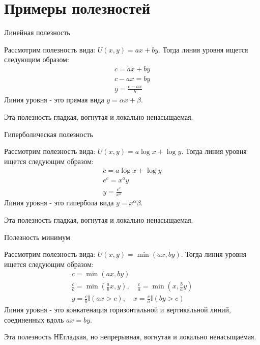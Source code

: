 \documentclass{beamer}
\begin{document}
\section{Примеры полезностей}

\begin{frame}{Линейная полезность}

Рассмотрим полезность вида: $U(x, y) = ax + by$. Тогда линия уровня ищется следующим образом: 
\begin{gather*}
c = ax + by\\
c-ax = by\\
y = \frac{c-ax}{b}
\end{gather*}
Линия уровня - это прямая вида $y = \alpha x + \beta$.

Эта полезность гладкая, вогнутая и локально ненасыщаемая.

\end{frame}

\begin{frame}{Гиперболическая полезность}

Рассмотрим полезность вида: $U(x, y) = a \log x + \log y$. Тогда линия уровня ищется следующим образом: 
\begin{gather*}
c =  a \log x + \log y\\
e^{c} = x^a y\\
y =\frac{e^{c}}{x^a}
\end{gather*}
Линия уровня - это гипербола вида $y = x^\alpha \beta$.

Эта полезность гладкая, вогнутая и локально ненасыщаемая.

\end{frame}

\begin{frame}{Полезность минимум}

Рассмотрим полезность вида: $U(x, y) = \min(ax, by)$. Тогда линия уровня ищется следующим образом: 
\begin{gather*}
c = \min(ax, by)\\
\frac{c}{b}= \min(\frac{a}{b}x, y), \quad \frac{c}{a}= \min(x, \frac{b}{a}y)\\
y = \frac{c}{b} \mathbb{I}(ax > c), \quad x = \frac{c}{a} \mathbb{I}(by > c)
\end{gather*}
Линия уровня - это конкатенация горизонтальной и вертикальной линий, соединенных вдоль $ax = by$.

Эта полезность НЕгладкая, но непрерывная, вогнутая и локально ненасыщаемая.

\end{frame}
\end{document}
